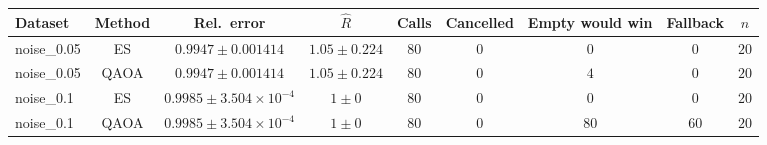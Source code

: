 \begin{longtable}{@{}lcccccccc@{}}
\toprule
Dataset & Method & Rel.\ error & \(\hat R\) & Calls & Cancelled & Empty would win & Fallback & \(n\) \\
\midrule
\endhead
noise\_0.05 & ES & \(0.9947 \pm 0.001414\) & \(1.05 \pm 0.224\) & \(80\) & \(0\) & \(0\) & \(0\) & \(20\) \\
noise\_0.05 & QAOA & \(0.9947 \pm 0.001414\) & \(1.05 \pm 0.224\) & \(80\) & \(0\) & \(4\) & \(0\) & \(20\) \\
noise\_0.1 & ES & \(0.9985 \pm 3.504{\times}10^{-4}\) & \(1 \pm 0\) & \(80\) & \(0\) & \(0\) & \(0\) & \(20\) \\
noise\_0.1 & QAOA & \(0.9985 \pm 3.504{\times}10^{-4}\) & \(1 \pm 0\) & \(80\) & \(0\) & \(80\) & \(60\) & \(20\) \\
\bottomrule
\end{longtable}
